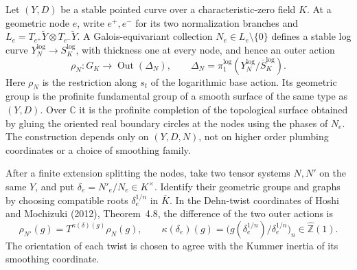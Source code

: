 \begin{lemma}
\label{A:tensor-log-comparison}
Let $(Y,D)$ be a stable pointed curve over a characteristic-zero field $K$.
At a geometric node $e$, write $e^+,e^-$ for its two normalization
branches and $L_e=T_{e^+}\widetilde Y\otimes T_{e^-}\widetilde Y$.
A Galois-equivariant collection $N_e\in L_e\setminus\{0\}$ defines a
stable log curve $Y_N^{\log}\to S_K^{\log}$, with thickness one at every
node, and hence an outer action
\[
 \rho_N:G_K\longrightarrow\operatorname{Out}(\Delta_N),\qquad
 \Delta_N=\pi_1^{\log}(Y_N^{\log}/\overline S_K^{\log}).
\]
Here $\rho_N$ is the restriction along $s_t$ of the logarithmic base
action. Its geometric group is the profinite fundamental group of a
smooth surface of the same type as $(Y,D)$. Over $\mathbb C$ it is the
profinite completion of the topological surface obtained by gluing the
oriented real boundary circles at the nodes using the phases of $N_e$.
The construction depends only on $(Y,D,N)$, not on higher order
plumbing coordinates or a choice of smoothing family.

After a finite extension splitting the nodes, take two tensor systems
$N,N'$ on the same $Y$, and put $\delta_e=N'_e/N_e\in K^\times$.
Identify their geometric groups and graphs by choosing compatible roots
$\delta_e^{1/n}$ in $\overline K$. In the Dehn-twist coordinates of
Hoshi and Mochizuki (2012), Theorem~4.8, the difference of the two
outer actions is
\begin{equation}\label{A:node-Kummer-action}
 \rho_{N'}(g)=T^{\kappa(\delta)(g)}\rho_N(g),\qquad
 \kappa(\delta_e)(g)=
 \bigl(g(\delta_e^{1/n})/\delta_e^{1/n}\bigr)_n
 \in\widehat{\mathbb Z}(1).
\end{equation}
The orientation of each twist is chosen to agree with the Kummer
inertia of its smoothing coordinate.
\end{lemma}

